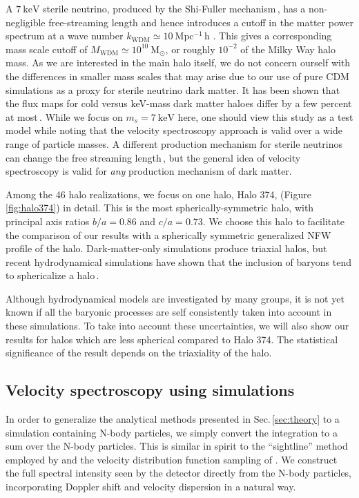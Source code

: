 \documentclass[aps,prd,10pt,twocolumn,superscriptaddress,showpacs,footinbib]{revtex4-1}
\newcommand{\units}[1]{~\mathrm{#1}}
\begin{document}
A $7\units{keV}$ sterile neutrino, produced by the Shi-Fuller mechanism\,\cite{Shi:1998km}, has a non-negligible free-streaming length and hence introduces a cutoff in
the matter power spectrum at a wave number $k_\mathrm{WDM} \simeq 10 \units{Mpc^{-1}\,h}$
\cite{ven2016}. This gives a corresponding mass scale cutoff of $M_\mathrm{WDM} \simeq 10^{10}
\units{M_\odot}$, or roughly $10^{-2}$ of the Milky Way halo mass. As we are interested in the main
halo itself, we do not concern ourself with the differences in smaller mass scales that may
arise due to our use of pure CDM simulations as a proxy for sterile neutrino dark matter. 
It has been shown that the flux maps for cold versus keV-mass dark matter
haloes differ by a few percent at most\,\cite{Lovell:2014lea}. While we focus on $m_s=7\units{keV}$ here,
one should view this study as a test model while noting that the velocity spectroscopy approach is
valid over a wide range of particle masses.  A different production mechanism for sterile neutrinos can change the free streaming length\,\cite{Merle:2014xpa}, but the general idea of velocity spectroscopy is valid for {\it any} production mechanism of dark matter.

Among the 46 halo realizations, we focus on one halo, Halo 374, (Figure\,\ref{fig:halo374}) in detail. This is the most spherically-symmetric halo, with principal axis ratios $b/a=0.86$ and $c/a=0.73$.  We choose this halo to facilitate the comparison of our results with a spherically symmetric generalized NFW profile of the halo.  Dark-matter-only simulations produce triaxial halos, but recent hydrodynamical simulations have shown that the inclusion of baryons tend to sphericalize a halo\,\cite{Debattista:2007yz,Bryan:2012mw,Bernal:2014mmt,Bernal:2016guq}.

Although hydrodynamical models are investigated by many groups, it is not yet known if all the baryonic processes are self consistently taken into account in these simulations.  To take into account these uncertainties, we will also show our results for halos which are less spherical compared to Halo 374.  The statistical significance of the result depends on the triaxiality of the halo.


\subsection{Velocity spectroscopy using simulations}
\label{sec:simulations}

In order to generalize the analytical methods presented in Sec.\,\ref{sec:theory} to a simulation
containing N-body particles, we simply convert the integration to a sum over the N-body particles.
This is similar in spirit to the ``sightline'' method employed by \cite{Lovell:2014lea} and the
velocity distribution function sampling of \cite{Mao:2012hf}.  We construct the full spectral
intensity seen by the detector directly from the N-body particles, incorporating Doppler shift and
velocity dispersion in a natural way.   
\end{document}
